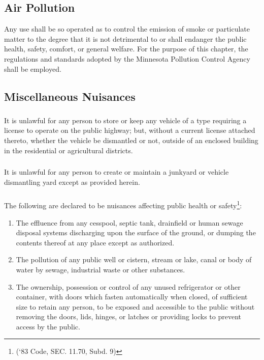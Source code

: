 \subsection{Air Pollution}
Any use shall be so operated as to control the emission of smoke or particulate matter to the degree that it is not detrimental to or shall endanger the public health, safety, comfort, or general welfare. For the purpose of this chapter, the regulations and standards adopted by the Minnesota Pollution Control Agency shall be employed.
\subsection{Miscellaneous Nuisances}
\subsubsection{}
It is unlawful for any person to store or keep any vehicle of a type requiring a license to operate on the public highway; but, without a current license attached thereto, whether the vehicle be dismantled or not, outside of an enclosed building in the residential or agricultural districts.
\subsubsection{}
It is unlawful for any person to create or maintain a junkyard or vehicle dismantling yard except as provided herein.
\subsubsection{}
The following are declared to be nuisances affecting public health or safety\footnote{(‘83 Code, SEC. 11.70, Subd. 9)}:
\begin{enumerate}[{\indent}a)]
    \item The effluence from any cesspool, septic tank, drainfield or human sewage disposal systems discharging upon the surface of the ground, or dumping the contents thereof at any place except as authorized.
    \item The pollution of any public well or cistern, stream or lake, canal or body of water by sewage, industrial waste or other substances.
    \item The ownership, possession or control of any unused refrigerator or other container, with doors which fasten automatically when closed, of sufficient size to retain any person, to be exposed and accessible to the public without removing the doors, lids, hinges, or latches or providing locks to prevent access by the public.
\end{enumerate}

